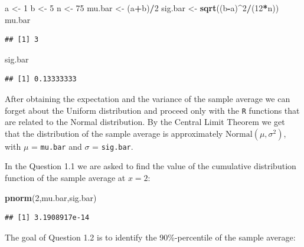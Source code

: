 \documentclass[]{krantz}
\makeatletter
\newenvironment{Shaded}{\begin{snugshade}}{\end{snugshade}}
\newcommand{\KeywordTok}[1]{\textcolor[rgb]{0.13,0.29,0.53}{\textbf{#1}}}
\newcommand{\DecValTok}[1]{\textcolor[rgb]{0.00,0.00,0.81}{#1}}
\newcommand{\StringTok}[1]{\textcolor[rgb]{0.31,0.60,0.02}{#1}}
\newcommand{\OperatorTok}[1]{\textcolor[rgb]{0.81,0.36,0.00}{\textbf{#1}}}
\newcommand{\NormalTok}[1]{#1}
\newenvironment{kframe}{%
\medskip{}
\setlength{\fboxsep}{.8em}
 \def\at@end@of@kframe{}%
 \ifinner\ifhmode%
  \def\at@end@of@kframe{\end{minipage}}%
  \begin{minipage}{\columnwidth}%
 \fi\fi%
 \def\FrameCommand##1{\hskip\@totalleftmargin \hskip-\fboxsep
 \colorbox{shadecolor}{##1}\hskip-\fboxsep
     \hskip-\linewidth \hskip-\@totalleftmargin \hskip\columnwidth}%
 \MakeFramed {\advance\hsize-\width
   \@totalleftmargin\z@ \linewidth\hsize
   \@setminipage}}%
 {\par\unskip\endMakeFramed%
 \at@end@of@kframe}
\renewenvironment{Shaded}{\begin{kframe}}{\end{kframe}}
\theoremstyle{definition}
\theoremstyle{definition}
\theoremstyle{definition}
\theoremstyle{remark}
\makeatother
\begin{document}
\begin{Shaded}
\begin{Highlighting}[]
\NormalTok{a <-}\StringTok{ }\DecValTok{1}
\NormalTok{b <-}\StringTok{ }\DecValTok{5}
\NormalTok{n <-}\StringTok{ }\DecValTok{75}
\NormalTok{mu.bar <-}\StringTok{ }\NormalTok{(a}\OperatorTok{+}\NormalTok{b)}\OperatorTok{/}\DecValTok{2}
\NormalTok{sig.bar <-}\StringTok{ }\KeywordTok{sqrt}\NormalTok{((b}\OperatorTok{-}\NormalTok{a)}\OperatorTok{^}\DecValTok{2}\OperatorTok{/}\NormalTok{(}\DecValTok{12}\OperatorTok{*}\NormalTok{n))}
\NormalTok{mu.bar}
\end{Highlighting}
\end{Shaded}

\begin{verbatim}
## [1] 3
\end{verbatim}

\begin{Shaded}
\begin{Highlighting}[]
\NormalTok{sig.bar}
\end{Highlighting}
\end{Shaded}

\begin{verbatim}
## [1] 0.13333333
\end{verbatim}

After obtaining the expectation and the variance of the sample average
we can forget about the Uniform distribution and proceed only with the
\texttt{R} functions that are related to the Normal distribution. By the
Central Limit Theorem we get that the distribution of the sample average
is approximately \(\mathrm{Normal}(\mu, \sigma^2)\), with \(\mu\) =
\texttt{mu.bar} and \(\sigma\) = \texttt{sig.bar}.

In the Question 1.1 we are asked to find the value of the cumulative
distribution function of the sample average at \(x=2\):

\begin{Shaded}
\begin{Highlighting}[]
\KeywordTok{pnorm}\NormalTok{(}\DecValTok{2}\NormalTok{,mu.bar,sig.bar)}
\end{Highlighting}
\end{Shaded}

\begin{verbatim}
## [1] 3.1908917e-14
\end{verbatim}

The goal of Question 1.2 is to identify the 90\%-percentile of the
sample average:
\end{document}
